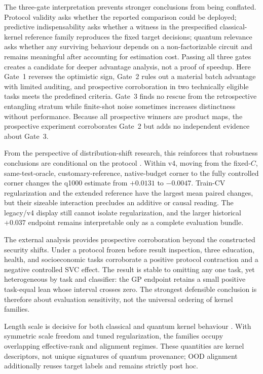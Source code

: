 \documentclass[referee,lineno,pdflatex,sn-nature]{sn-jnl}
\theoremstyle{thmstyleone}%
\theoremstyle{thmstyletwo}%
\theoremstyle{thmstylethree}%
\begin{document}
The three-gate interpretation prevents stronger conclusions from being conflated. Protocol validity asks whether the reported comparison could be deployed; predictive indispensability asks whether a witness in the prespecified classical-kernel reference family reproduces the fixed target decisions; quantum relevance asks whether any surviving behaviour depends on a non-factorizable circuit and remains meaningful after accounting for estimation cost. Passing all three gates creates a candidate for deeper advantage analysis, not a proof of speedup. Here Gate~1 reverses the optimistic sign, Gate~2 rules out a material batch advantage with limited auditing, and prospective corroboration in two technically eligible tasks meets the predefined criteria. Gate~3 finds no rescue from the retrospective entangling stratum while finite-shot noise sometimes increases distinctness without performance. Because all prospective winners are product maps, the prospective experiment corroborates Gate~2 but adds no independent evidence about Gate~3.

From the perspective of distribution-shift research, this reinforces that robustness conclusions are conditional on the protocol \cite{quinonero-candela2008datasetshift,gulrajani2021domainbed,koh2021wilds,yao2022wildtime}. Within v4, moving from the fixed-$C$, same-test-oracle, customary-reference, native-budget corner to the fully controlled corner changes the q1000 estimate from $+0.0131$ to $-0.0047$. Train-CV regularization and the extended reference have the largest mean paired changes, but their sizeable interaction precludes an additive or causal reading. The legacy/v4 display still cannot isolate regularization, and the larger historical $+0.037$ endpoint remains interpretable only as a complete evaluation bundle.

The external analysis provides prospective corroboration beyond the constructed security shifts. Under a protocol frozen before result inspection, three education, health, and socioeconomic tasks corroborate a positive protocol contraction and a negative controlled SVC effect. The result is stable to omitting any one task, yet heterogeneous by task and classifier: the GP endpoint retains a small positive task-equal lean whose interval crosses zero. The strongest defensible conclusion is therefore about evaluation sensitivity, not the universal ordering of kernel families.

Length scale is decisive for both classical and quantum kernel behaviour \cite{shaydulin2022bandwidth,canatar2023bandwidth}. With symmetric scale freedom and tuned regularization, the families occupy overlapping effective-rank and alignment regimes. These quantities are kernel descriptors, not unique signatures of quantum provenance; OOD alignment additionally reuses target labels and remains strictly post hoc.
\end{document}
